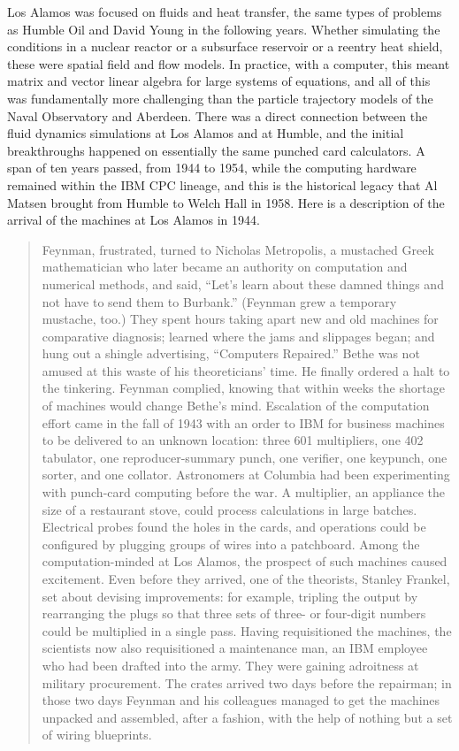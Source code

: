 Los Alamos was focused on fluids and heat transfer, the same types of problems as Humble Oil and David Young in the following years. Whether simulating the conditions in a nuclear reactor or a subsurface reservoir or a reentry heat shield, these were spatial field and flow models. In practice, with a computer, this meant matrix and vector linear algebra for large systems of equations, and all of this was fundamentally more challenging than the particle trajectory models of the Naval Observatory and Aberdeen. There was a direct connection between the fluid dynamics simulations at Los Alamos and at Humble, and the initial breakthroughs happened on essentially the same punched card calculators. A span of ten years passed, from 1944 to 1954, while the computing hardware remained within the IBM CPC lineage, and this is the historical legacy that Al Matsen brought from Humble to Welch Hall in 1958. Here is a description of the arrival of the machines at Los Alamos in 1944.

\begin{quotation}
Feynman, frustrated, turned to Nicholas Metropolis, a mustached Greek mathematician who later became an authority on computation and numerical methods, and said, “Let’s learn about these damned things and not have to send them to Burbank.” (Feynman grew a temporary mustache, too.) They spent hours taking apart new and old machines for comparative diagnosis; learned where the jams and slippages began; and hung out a shingle advertising, “Computers Repaired.” Bethe was not amused at this waste of his theoreticians’ time. He finally ordered a halt to the tinkering. Feynman complied, knowing that within weeks the shortage of machines would change Bethe’s mind. Escalation of the computation effort came in the fall of 1943 with an order to IBM for business machines to be delivered to an unknown location: three 601 multipliers, one 402 tabulator, one reproducer-summary punch, one verifier, one keypunch, one sorter, and one collator. Astronomers at Columbia had been experimenting with punch-card computing before the war. A multiplier, an appliance the size of a restaurant stove, could process calculations in large batches. Electrical probes found the holes in the cards, and operations could be configured by plugging groups of wires into a patchboard. Among the computation-minded at Los Alamos, the prospect of such machines caused excitement. Even before they arrived, one of the theorists, Stanley Frankel, set about devising improvements: for example, tripling the output by rearranging the plugs so that three sets of three- or four-digit numbers could be multiplied in a single pass. Having requisitioned the machines, the scientists now also requisitioned a maintenance man, an IBM employee who had been drafted into the army. They were gaining adroitness at military procurement. The crates arrived two days before the repairman; in those two days Feynman and his colleagues managed to get the machines unpacked and assembled, after a fashion, with the help of nothing but a set of wiring blueprints. \cite{gleickGeniusLifeScience1992}
\end{quotation}

